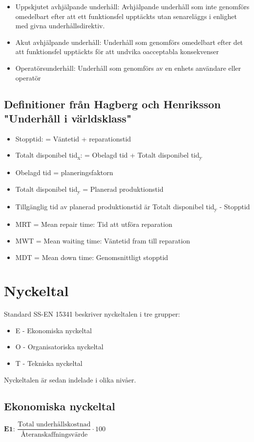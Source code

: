 \begin{itemize}
	\item Uppskjutet avhjälpande underhåll: Avhjälpande underhåll som inte genomförs omedelbart efter att ett funktionsfel upptäckts utan senareläggs i enlighet med givna underhållsdirektiv.
	\item Akut avhjälpande underhåll: Underhåll som genomförs omedelbart efter det att funktionsfel upptäckts för att undvika oacceptabla konsekvenser
	\item Operatörsunderhåll: Underhåll som genomförs av en enhets användare eller operatör
\end{itemize}	
	
	
	\subsection*{Definitioner från Hagberg och Henriksson "Underhåll i världsklass"}
	
\begin{itemize}	
	\item Stopptid: = Väntetid + reparationstid
	\item Totalt disponibel tid\textsubscript{x}: = Obelagd tid + Totalt disponibel tid\textsubscript{y}
	\item Obelagd tid = planeringsfaktorn
	\item Totalt disponibel tid\textsubscript{y} = Planerad produktionstid
	\item Tillgänglig tid av planerad produktionstid är Totalt disponibel tid\textsubscript{y} - Stopptid
	\item MRT = Mean repair time: Tid att utföra reparation
	\item MWT = Mean waiting time: Väntetid fram till reparation
	\item MDT = Mean down time: Genomsnittligt stopptid
\end{itemize}	
	

	\section*{Nyckeltal}
	Standard SS-EN 15341 beskriver nyckeltalen i tre grupper:
	\begin{itemize}
	 \item E - Ekonomiska nyckeltal
	 \item O - Organisatoriska nyckeltal
	 \item T - Tekniska nyckeltal
	\end{itemize}
Nyckeltalen är sedan indelade i olika nivåer.
\subsection*{Ekonomiska nyckeltal}
		$\textbf{E1: } \dfrac{\text{Total underhållskostnad}}{\text{Återanskaffningsvärde}} \cdot 100$
			

